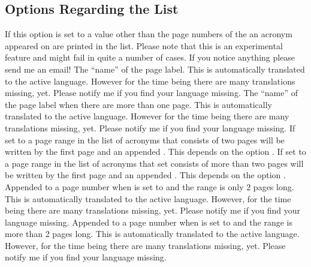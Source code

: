 \documentclass[DIV10,toc=index,toc=bib,hyperfootnotes=false]{cnpkgdoc}
\begin{document}
\subsection{Options Regarding the List}
\begin{beschreibung}
   If this option is set to a value other than  the page numbers of
   the an acronym appeared on are printed in the list. Please note that this
   is an experimental feature and might fail in quite a number of cases. If you
   notice anything please send me an email!
   The ``name'' of the page label. This is automatically translated to the
   active language. However for the time being there are many translations
   missing, yet. Please notify me if you find your language missing.
   The ``name'' of the page label when there are more than one
   page. This is automatically translated to the active language. However for the
   time being there are many translations missing, yet. Please notify me if you
   find your language missing.
   If set to  a page range in the list of acronyms
   that consists of two pages will be written by the first page and an appended
   . This depends on the option .
   If set to  a page range in the list of acronyms
   that set consists of more than two pages will be written by the first page
   and an appended . This depends on the option .
   Appended to a page number when  is set to
    and the range is only 2 pages long. This is automatically
   translated to the active language. However, for the time being there are many
   translations missing, yet. Please notify me if you find your language missing.
   Appended to a page number when  is set to
    and the range is more than 2 pages long. This is automatically
   translated to the active language. However, for the time being there are many
   translations missing, yet. Please notify me if you find your language missing.

\end{beschreibung}
\end{document}
